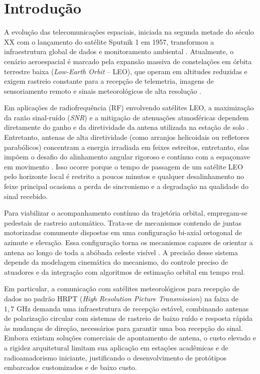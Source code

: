 
\chapter*[Introdução]{Introdução}

A evolução das telecomunicações espaciais, iniciada na segunda metade do século XX com o lançamento do satélite Sputnik 1 em 1957, transformou a infraestrutura global de dados e monitoramento ambiental \cite{Ford2008}.
Atualmente, o cenário aeroespacial é marcado pela expansão massiva de constelações em órbita terrestre baixa (\textit{Low-Earth Orbit} -- LEO), que operam em altitudes reduzidas e exigem rastreio constante para a recepção de telemetria, imagens de sensoriamento remoto e sinais meteorológicos de alta resolução \cite{app12199505}.

Em aplicações de radiofrequência (RF) envolvendo satélites LEO, a maximização da razão sinal-ruído (\textit{SNR}) e a mitigação de atenuações atmosféricas dependem diretamente do ganho e da diretividade da antena utilizada na estação de solo \cite{hubregt2014}.
Entretanto, antenas de alta diretividade (como arranjos helicoidais ou refletores parabólicos) concentram a energia irradiada em feixes estreitos, entretanto, elas impõem o desafio do alinhamento angular rigoroso e contínuo com a espaçonave em movimento \cite{Ford2008}.
Isso ocorre porque o tempo de passagem de um satélite LEO pelo horizonte local é restrito a poucos minutos e qualquer desalinhamento no feixe principal ocasiona a perda de sincronismo e a degradação na qualidade do sinal recebido.

Para viabilizar o acompanhamento contínuo da trajetória orbital, empregam-se pedestais de rastreio automático.
Trata-se de mecanismos contendo de juntas motorizadas comumente dispostas em uma configuração bi-axial ortogonal de azimute e elevação.
Essa configuração torna os mecanismos capazes de orientar a antena ao longo de toda a abóbada celeste visível \cite{Bien2021}.
A precisão desse sistema depende da modelagem cinemática do mecanismo, do controle preciso de atuadores e da integração com algoritmos de estimação orbital em tempo real.

Em particular, a comunicação com satélites meteorológicos para recepção de dados no padrão HRPT (\textit{High Resolution Picture Transmission}) na faixa de $1,7\text{ GHz}$ demanda uma infraestrutura de recepção estável,
combinando antenas de polarização circular com sistemas de rastreio de baixo ruído e resposta rápida às mudanças de direção, necessários para garantir uma boa recepção do sinal.
Embora existam soluções comerciais de apontamento de antena, o custo elevado e a rigidez arquitetural limitam sua aplicação em estações acadêmicas e de radioamadorismo iniciante, justificando o desenvolvimento de protótipos embarcados customizados e de baixo custo.

